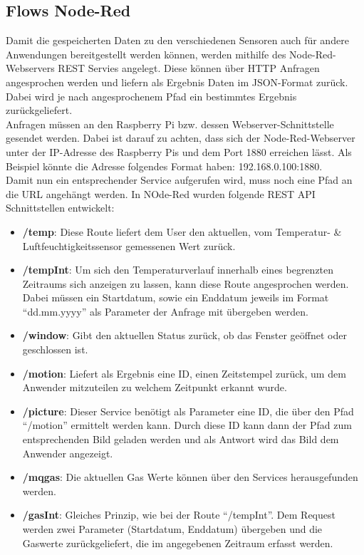 \subsection{Flows Node-Red}
Damit die gespeicherten Daten zu den verschiedenen Sensoren auch für andere Anwendungen bereitgestellt werden können, werden mithilfe des Node-Red-Webservers REST Servies angelegt. Diese können über \ac{HTTP} Anfragen angesprochen werden und liefern als Ergebnis Daten im \ac{JSON}-Format zurück. Dabei wird je nach angesprochenem Pfad ein bestimmtes Ergebnis zurückgeliefert. \\Anfragen müssen an den Raspberry Pi bzw. dessen Webserver-Schnittstelle gesendet werden. Dabei ist darauf zu achten, dass sich der Node-Red-Webserver unter der \ac{IP}-Adresse des Raspberry Pis und dem Port 1880 erreichen lässt. Als Beispiel könnte die Adresse folgendes Format haben: 192.168.0.100:1880. \\Damit nun ein entsprechender Service aufgerufen wird, muss noch eine Pfad an die \ac{URL} angehängt werden. In NOde-Red wurden folgende REST \ac{API} Schnittstellen entwickelt:
\begin{itemize}
	\item \textbf{/temp}: Diese Route liefert dem User den aktuellen, vom Temperatur- \& Luftfeuchtigkeitssensor gemessenen Wert zurück. 
	\item \textbf{/tempInt}: Um sich den Temperaturverlauf innerhalb eines begrenzten Zeitraums sich anzeigen zu lassen, kann diese Route angesprochen werden. Dabei müssen ein Startdatum, sowie ein Enddatum jeweils im Format \enquote{dd.mm.yyyy} als Parameter der Anfrage mit übergeben werden.
	\item \textbf{/window}: Gibt den aktuellen Status zurück, ob das Fenster geöffnet oder geschlossen ist.
	\item \textbf{/motion}: Liefert als Ergebnis eine ID, einen Zeitstempel zurück, um dem Anwender mitzuteilen zu welchem Zeitpunkt erkannt wurde.
	\item \textbf{/picture}: Dieser Service benötigt als Parameter eine ID, die über den Pfad \enquote{/motion} ermittelt werden kann. Durch diese ID kann dann der Pfad zum entsprechenden Bild geladen werden und als Antwort wird das Bild dem Anwender angezeigt.
	\item \textbf{/mqgas}: Die aktuellen Gas Werte können über den Services herausgefunden werden.
	\item \textbf{/gasInt}: Gleiches Prinzip, wie bei der Route \enquote{/tempInt}. Dem Request werden zwei Parameter (Startdatum, Enddatum) übergeben und die Gaswerte zurückgeliefert, die im angegebenen Zeitraum erfasst werden.
\end{itemize}

